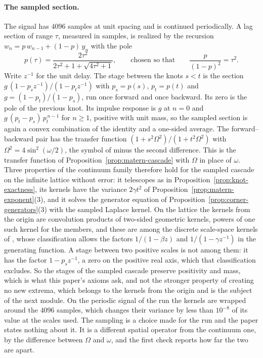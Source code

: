 \paragraph{The sampled section.}
The signal has $4096$ samples at unit spacing and is continued periodically. A lag section of
range $\tau$, measured in samples, is realized by the recursion
$w_n = p\,w_{n-1} + (1-p)\,y_n$ with the pole
\[
  p(\tau) = \frac{2\tau^2}{2\tau^2 + 1 + \sqrt{4\tau^2 + 1}},
  \qquad\text{chosen so that}\qquad \frac{p}{(1-p)^2} = \tau^2 .
\]
Write $z^{-1}$ for the unit delay. The stage between the knots $s < t$ is the section
$g\,(1 - p_sz^{-1})/(1 - p_tz^{-1})$ with $p_s = p(s)$, $p_t = p(t)$ and
$g = (1-p_t)/(1-p_s)$, run once forward and once backward. Its zero is the pole of the
previous knot. Its impulse response is $g$ at $n = 0$ and $g\,(p_t - p_s)\,p_t^{\,n-1}$ for
$n \ge 1$, positive with unit mass, so the sampled section is again a convex combination of
the identity and a one-sided average. The forward--backward pair has the transfer function
$(1 + s^2\Omega^2)/(1 + t^2\Omega^2)$ with $\Omega^2 = 4\sin^2(\omega/2)$, the symbol of minus
the second difference. This is the transfer function of
Proposition~\ref{prop:matern-cascade} with $\Omega$ in place of $\omega$. Three properties of
the continuum family therefore hold for the sampled cascade on the infinite lattice without
error: it telescopes as in Proposition~\ref{prop:knot-exactness}, its kernels have the variance
$2\gamma t^2$ of Proposition~\ref{prop:matern-exponent}(3), and it solves the generator
equation of Proposition~\ref{prop:corner-generators}(3) with the sampled Laplace kernel. On the
lattice the kernels from the origin are convolution products of two-sided geometric kernels,
powers of one such kernel for the \Matern{} members, and these are among the discrete scale-space kernels of , whose
classification allows the factors $1/(1 - \beta z)$ and $1/(1 - \gamma z^{-1})$ in the
generating function. A stage between two positive scales is not among them: it has the
factor $1 - p_sz^{-1}$, a zero on the positive real axis, which that classification excludes.
So the stages of the sampled cascade preserve positivity and mass, which is what this paper's
axioms ask, and not the stronger property of creating no new extrema, which belongs to the
kernels from the origin and is the subject of the next module. On the
periodic signal of the run the kernels are wrapped around the $4096$ samples, which changes
their variance by less than $10^{-8}$ of its value at the scales used. The sampling is a choice made for
the run and the paper states nothing about it. It is a different spatial operator from the
continuum one, by the difference between $\Omega$ and $\omega$, and the first check reports
how far the two are apart.

